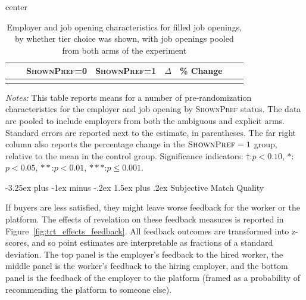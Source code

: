 \documentclass[12pt]{article}
\makeatletter
\renewcommand{\subsection}{%
  \@startsection{subsection}{2}{\z@}%
  {-3.25ex plus -1ex minus -.2ex}%
  {1.5ex plus .2ex}%
  {\normalfont\large\bfseries}%
}
\newcommand{\starlanguage}{Significance indicators: $\dagger$:$p < 0.10$, $*$:$p < 0.05$, $**$:$p < 0.01$, $***$:$p \le 0.001$.}
\makeatother
\begin{document}
\begin{table}[h!]
\begin{center}
\caption{Employer and job opening characteristics for filled job openings,  by whether tier choice was shown, with job openings pooled from both arms of the experiment}
\label{tab:balance_big_filled}
\begin{small}
\begin{adjustbox}{center}
\begin{tabular}{lllccccc}
\toprule
&   & \multicolumn{1}{c}{\parbox[t][][t]{2.3cm}{{\footnotesize \textsc{ShownPref}=0}}}
&     \multicolumn{1}{c}{\parbox[t][][t]{2.3cm}{\footnotesize  \textsc{ShownPref=1}}}
&     \multicolumn{1}{c}{\parbox[t][][t]{2.0cm}{$\Delta$}}
&     \multicolumn{1}{c}{\parbox[t][][t]{1cm}{\% Change}}
\\
\hline

 \\

\bottomrule
\end{tabular}
\end{adjustbox}
\end{small}
\end{center}
\begin{minipage}{1.0 \textwidth}
\begin{footnotesize}
\begin{singlespace}
  \emph{Notes:} This table reports means for a number of pre-randomization characteristics for the employer and job opening by \textsc{ShownPref} status.
  The data are pooled to include employers from both the ambiguous and explicit arms.
Standard errors are reported next to the estimate, in parentheses.
The far right column also reports the percentage change in the $\textsc{ShownPref}=1$ group, relative to the mean in the control group. 
\starlanguage
\end{singlespace}
\end{footnotesize}
\end{minipage}
\end{table}




\subsection{Subjective Match Quality} 

If buyers are less satisfied, they might leave worse feedback for the worker or the platform.
The effects of revelation on these feedback measures is reported in Figure~\ref{fig:trt_effects_feedback}.
All feedback outcomes are transformed into z-scores, and so point estimates are interpretable as fractions of a standard deviation. 
The top panel is the employer's feedback to the hired worker, the middle panel is the worker's feedback to the hiring employer, and the bottom panel is the feedback of the employer to the platform (framed as a probability of recommending the platform to someone else).  
\end{document}
